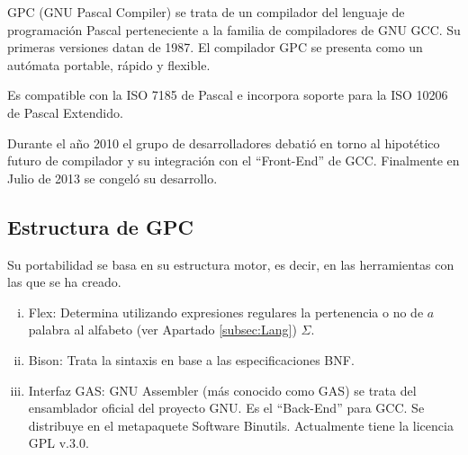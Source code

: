 GPC (GNU Pascal Compiler) se trata de un compilador del lenguaje de programación Pascal
perteneciente a la familia de compiladores de GNU 
GCC. Su primeras versiones datan de 1987. El compilador GPC se presenta como un autómata portable, rápido y flexible. 

Es compatible con la ISO 7185 de Pascal e incorpora soporte para la ISO 10206 de Pascal Extendido.

Durante el año 2010 el grupo de desarrolladores debatió en torno al hipotético futuro de compilador y su integración con el ``Front-End'' de GCC.
Finalmente en Julio de 2013 se congeló su desarrollo.

\subsection{Estructura de GPC}

Su portabilidad se basa en su estructura motor, es decir, en las herramientas
con las que se ha creado. 

\begin{enumerate}[i.]

\item Flex: Determina utilizando expresiones regulares la pertenencia o no de 
$a$ palabra al alfabeto (ver Apartado \ref{subsec:Lang}) $\Sigma$.

\item Bison: Trata la sintaxis en base a las especificaciones BNF.
 
\item Interfaz GAS: GNU Assembler (más conocido como GAS) se trata del ensamblador oficial del proyecto GNU. Es el ``Back-End'' para GCC. Se distribuye en el metapaquete Software Binutils. Actualmente tiene la licencia GPL v.3.0.

\end{enumerate}



